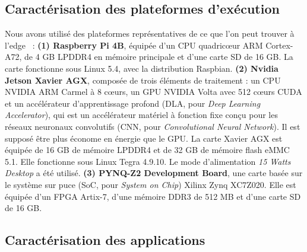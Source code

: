 \subsection{Caractérisation des plateformes d'exécution} \label{section:herocache-characterization-platforms}

Nous avons utilisé des plateformes représentatives de ce que l'on peut trouver à l'edge~\cite{slimani:hal-04159551, kljucaric2020} :
\textbf{(1) Raspberry Pi 4B}, équipée d'un \gls{CPU} quadricœur ARM Cortex-A72, de 4 GB LPDDR4 en mémoire principale et d'une carte SD de 16 GB. La carte fonctionne sous Linux 5.4, avec la distribution Raspbian.
\textbf{(2) Nvidia Jetson Xavier AGX}, composée de trois éléments de traitement : un \gls{CPU} NVIDIA ARM Carmel à 8 cœurs, un \gls{GPU} NVIDIA Volta avec 512 cœurs CUDA et un accélérateur d'apprentissage profond (\gls{DLA}, pour \textit{Deep Learning Accelerator}), qui est un accélérateur matériel à fonction fixe conçu pour les réseaux neuronaux convolutifs (\gls{CNN}, pour \textit{Convolutional Neural Network}). Il est supposé être plus économe en énergie que le \gls{GPU}. La carte Xavier AGX est équipée de 16 GB de mémoire LPDDR4 et de 32 GB de mémoire flash eMMC 5.1. Elle fonctionne sous Linux Tegra 4.9.10. Le mode d'alimentation \textit{15 Watts Desktop} a été utilisé.
\textbf{(3) PYNQ-Z2 Development Board}, une carte basée sur le système sur puce (\gls{SoC}, pour \textit{System on Chip}) Xilinx Zynq XC7Z020. Elle est équipée d'un \gls{FPGA} Artix-7, d'une mémoire DDR3 de 512 MB et d'une carte SD de 16 GB.

\subsection{Caractérisation des applications}
\label{section:herocache-characterization-workloads}

